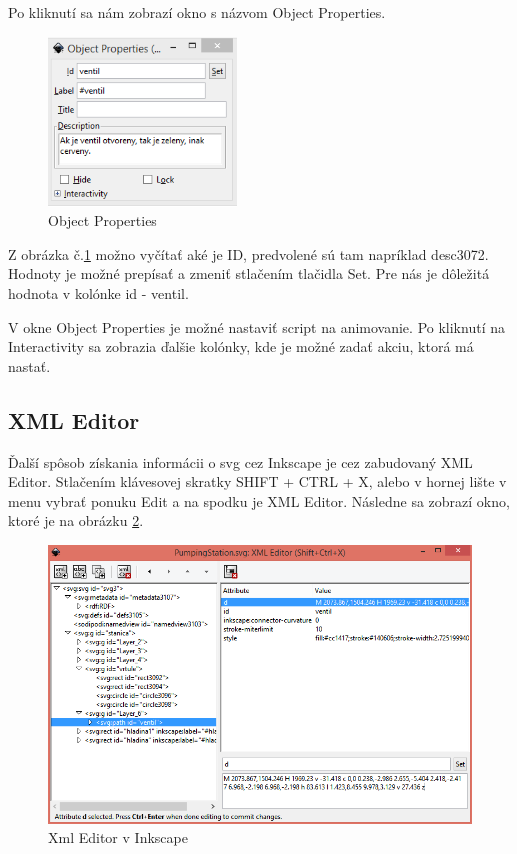 Po kliknutí sa nám zobrazí okno s názvom Object Properties. 

\begin{figure}[H]
	\begin{center}
		\includegraphics [width=5cm]  {obrazky/obr3.png}
		\caption{Object Properties}
		\label{picture3}
	\end{center}
\end{figure}


Z obrázka č.\ref{picture3} možno vyčítať aké je ID, predvolené sú tam napríklad desc3072. Hodnoty je možné prepísať a zmeniť stlačením tlačidla Set. Pre nás je dôležitá hodnota v kolónke id - ventil. 

V okne Object Properties je možné nastaviť script na animovanie. Po kliknutí na Interactivity sa zobrazia ďalšie kolónky, kde je možné zadať akciu, ktorá má nastať.  


\subsection{XML Editor}
Ďalší spôsob získania informácii o svg cez Inkscape je cez zabudovaný XML Editor.
Stlačením klávesovej skratky SHIFT + CTRL + X, alebo v hornej lište v menu vybrať ponuku Edit a na spodku je XML Editor. Následne sa zobrazí okno, ktoré je na obrázku \ref{xmlEditor}.
\begin{figure}[H]
	\begin{center}
		\includegraphics[width=0.6\linewidth]  {obrazky/XmlEditor2.png}
		\caption{Xml Editor v Inkscape}
		\label{xmlEditor}
	\end{center}
\end{figure}

